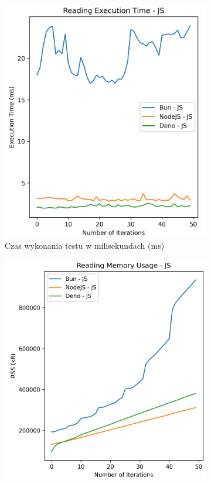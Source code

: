 \begin{figure}[H]
  \centering
  \begin{subfigure}[b]{0.42\textwidth}
    \centering
    \includegraphics[width=\textwidth]{Figures/files/files_writing_50_2000_50_js_time.png}
    \caption{Czas wykonania testu w milisekundach (ms)}
    \label{fig:file_e2_writing_js_time}
  \end{subfigure}
  \begin{subfigure}[b]{0.42\textwidth}
    \centering
    \includegraphics[width=\textwidth]{Figures/files/files_writing_50_2000_50_js_memory.png}

\end{subfigure}
\end{figure}
